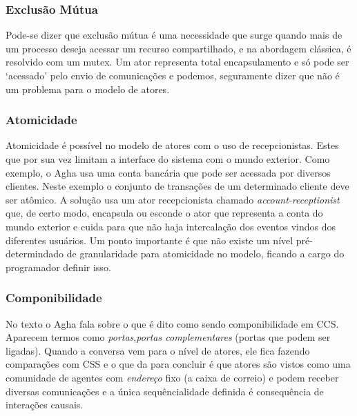 \documentclass[]{article}
\begin{document}
		\subsubsection{Exclusão Mútua}
		\par Pode-se dizer que exclusão mútua é uma necessidade que surge quando mais de um processo deseja
		acessar um recurso compartilhado, e na abordagem clássica, é resolvido com um mutex. Um ator representa
		total encapsulamento e só pode ser `acessado' pelo envio de comunicações e podemos, seguramente dizer que
		não é um problema para o modelo de atores.
		
		\subsubsection{Atomicidade}
		\par Atomicidade é possível no modelo de atores com o uso de recepcionistas. Estes que por sua vez
		limitam a interface do sistema com o mundo exterior. Como exemplo, o Agha usa uma conta bancária que
		pode ser acessada por diversos clientes. Neste exemplo o conjunto de transações de um determinado cliente
		deve ser atômico. A solução usa um ator recepcionista chamado \textit{account-receptionist} que, de certo
		modo, encapsula ou esconde o ator que representa a conta do mundo exterior e cuida para que não haja 
		intercalação dos eventos vindos dos diferentes usuários. Um ponto importante é que não existe um nível
		pré-determindado de granularidade para atomicidade no modelo, ficando a cargo do programador definir isso.
		
		\subsubsection{Componibilidade}
		\par No texto o Agha fala sobre o que é dito como sendo componibilidade em CCS. Aparecem termos como
		\emph{portas},\emph{portas complementares} (portas que podem ser ligadas). Quando a conversa vem para
		o nível de atores, ele fica fazendo comparações com CSS e o que da para concluir é que atores são vistos
		como uma comunidade de agentes com \emph{endereço} fixo (a caixa de correio) e podem receber diversas 
		comunicações e a única sequêncialidade definida é consequência de interações causais.
		
\end{document}
